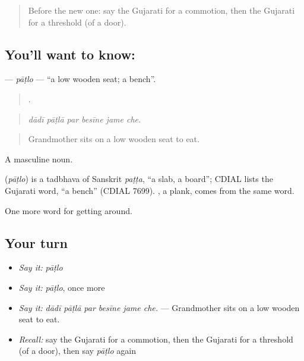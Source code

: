 \label{lesson:GU-C397-patlo}



\begin{quote}
Before the new one: say the Gujarati for a commotion, then the Gujarati for a threshold (of a door).
\end{quote}

\subsection*{You'll want to know: }
\textbf{} — \emph{pāṭlo} — \textquotedblleft{}a low wooden seat; a bench\textquotedblright{}.

\begin{quote}
     .
\end{quote}

\begin{quote}
\emph{dādī pāṭlā par besīne jame che.}
\end{quote}

\begin{quote}
Grandmother sits on a low wooden seat to eat.
\end{quote}

A masculine noun.

\begin{cousinweb}
\textbf{} (\emph{pāṭlo}) is a tadbhava of Sanskrit \emph{paṭṭa}, \textquotedblleft{}a slab, a board\textquotedblright{}; CDIAL lists the Gujarati word, \textquotedblleft{}a bench\textquotedblright{} (CDIAL 7699). , a plank, comes from the same word.
\end{cousinweb}

\begin{grammarlens}[title={What you've built}]
One more word for getting around.
\end{grammarlens}

\subsection*{Your turn}
\begin{itemize}
\raggedright
  \item \emph{Say it:} \emph{pāṭlo}
  \item \emph{Say it:} \emph{pāṭlo}, once more
  \item \emph{Say it:} \emph{dādī pāṭlā par besīne jame che.} — Grandmother sits on a low wooden seat to eat.
  \item \emph{Recall:} say the Gujarati for a commotion, then the Gujarati for a threshold (of a door), then say \emph{pāṭlo} again
\end{itemize}

